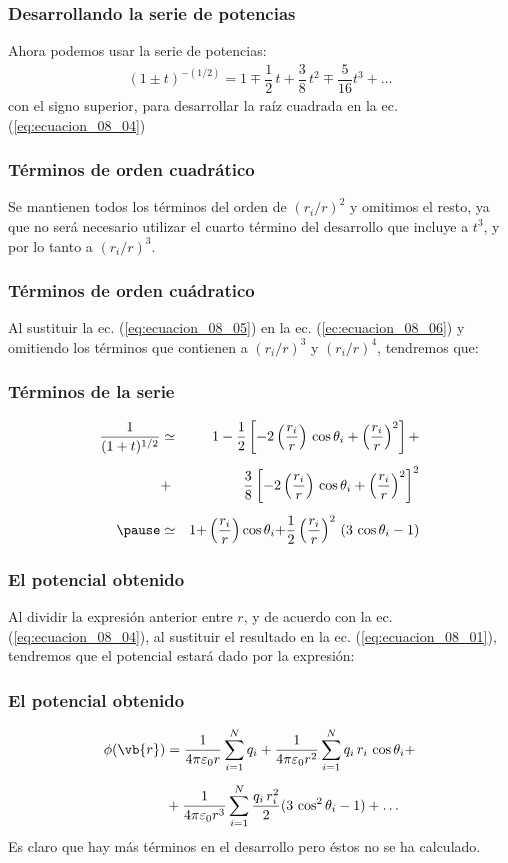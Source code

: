 \begin{frame}
\frametitle{Desarrollando la serie de potencias}
Ahora podemos usar la serie de potencias:
\begin{align}
(1 \pm t)^{-(1/2)} = 1 \mp \dfrac{1}{2} \, t + \dfrac{3}{8} \, t^{2} \mp \dfrac{5}{16} t^{3} + \ldots
\label{ec:ecuacion_08_06}
\end{align}
con el signo superior, para desarrollar la raíz cuadrada en la ec. (\ref{eq:ecuacion_08_04})
\end{frame}
\begin{frame}
\frametitle{Términos de orden cuadrático}
Se mantienen todos los términos del orden de $(r_{i}/r)^{2}$ y omitimos el resto, ya que no será necesario utilizar el cuarto término del desarrollo que incluye a $t^{3}$, y por lo tanto a $(r_{i}/r)^{3}$.
\end{frame}
\begin{frame}
\frametitle{Términos de orden cuádratico}
Al sustituir la ec. (\ref{eq:ecuacion_08_05}) en la ec. (\ref{ec:ecuacion_08_06}) y omitiendo los términos que contienen a $(r_{i}/r)^{3}$ y $(r_{i}/r)^{4}$, tendremos que:
\end{frame}
\begin{frame}
\frametitle{Términos de la serie}
\begin{eqnarray*}
\dfrac{1}{(1 + t)^{1/2}} &\simeq& 1 - \dfrac{1}{2} \left[ -2 \left( \dfrac{r_{i}}{r} \right) \, \cos \theta_{i} + \left( \dfrac{r_{i}}{r} \right)^{2} \right] + \\[0.5em]
&+& \dfrac{3}{8} \left[ -2 \left( \dfrac{r_{i}}{r} \right) \, \cos \theta_{i} + \left( \dfrac{r_{i}}{r} \right)^{2} \right]^{2} \\[0.5em] \pause
&\simeq& 1 {+} \left( \dfrac{r_{i}}{r} \right) \cos \theta_{i} {+} \dfrac{1}{2} \left( \dfrac{r_{i}}{r} \right)^{2} \, (3 \, \cos \theta_{i} - 1)
\end{eqnarray*}
\end{frame}
\begin{frame}
\frametitle{El potencial obtenido}
Al dividir la expresión anterior entre $r$, y de acuerdo con la ec. (\ref{eq:ecuacion_08_04}), al sustituir el resultado en la ec. (\ref{eq:ecuacion_08_01}), tendremos que el potencial estará dado por la expresión:
\end{frame}
\begin{frame}
\frametitle{El potencial obtenido}
\begin{align}
\begin{aligned}[b]
\phi(\vb{r}) &= \dfrac{1}{4 \pi \varepsilon_{0} r} \sum_{i=1}^{N} q_{i} + \dfrac{1}{4 \pi \varepsilon_{0} r^{2}} \sum_{i=1}^{N} q_{i} \, r_{i} \, \cos \theta_{i} + \\[0.5em]
&+ \dfrac{1}{4 \pi \varepsilon_{0} r^{3}} \sum_{i=1}^{N} \dfrac{q_{i} \, r_{i}^{2}}{2} (3 \, \cos^{2} \theta_{i} - 1) + \ldots
\end{aligned}
\label{eq:ecuacion_08_07}
\end{align}
\pause
Es claro que hay más términos en el desarrollo pero éstos no se ha calculado.
\end{frame}
